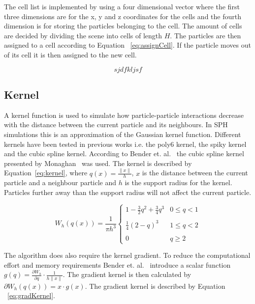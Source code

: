 \documentclass[journal]{vgtc}                %
\begin{document}
    The cell list is implemented by using a four dimensional vector where the first three dimensions are for the x, y and z coordinates for the cells and the fourth dimension is for storing the particles belonging to the cell.
    The amount of cells are decided by dividing the scene into cells of length $H$.
    The particles are then assigned to a cell according to Equation ~\ref{eq:assignCell}.
    If the particle moves out of its cell it is then assigned to the new cell.

    \begin{equation} \label{eq:assignCell}
        sjdfkljsf
    \end{equation}

\subsection{Kernel}
    A kernel function is used to simulate how particle-particle interactions decrease with the distance between the current particle and its neighbours. In SPH simulations this is an approximation of the Gaussian kernel function. Different kernels have been tested in previous works i.e. the poly6 kernel, the spiky kernel and the cubic spline kernel. According to Bender et. al.~\cite{bender} the cubic spline kernel presented by Monaghan~\cite{monaghan} was used. The kernel is described by Equation~\ref{eq:kernel}, where $q(x)=\frac{\left \| x \right \|}{h}$, $x$ is the distance between the current particle and a neighbour particle and $h$ is the support radius for the kernel. Particles further away than the support radius will not affect the current particle.   

    \begin{equation} \label{eq:kernel}
        W_h(q(x)) =  \frac{1}{\pi h^3} \left\{\begin{matrix}
        1 - \frac{3}{2}q^2 + \frac{3}{4}q^3 & 0 \leqslant q < 1 \\ 
        \\
        \frac{1}{4}(2-q)^3 & 1 \leqslant q < 2\\ 
        \\
        0 & q \geqslant 2
      \end{matrix}\right.
    \end{equation}

    The algorithm does also require the kernel gradient. To reduce the computational effort and memory requirements Bender et. al.~\cite{bender} introduce a scalar function $g(q) = \frac{\partial W_h}{\partial q} \cdot \frac{1}{h \left \| x \right \|}$. The gradient kernel is then calculated by $\partial W_h(q(x)) = x \cdot g(x)$. The gradient kernel is described by Equation ~\ref{eq:gradKernel}. 
\end{document}
